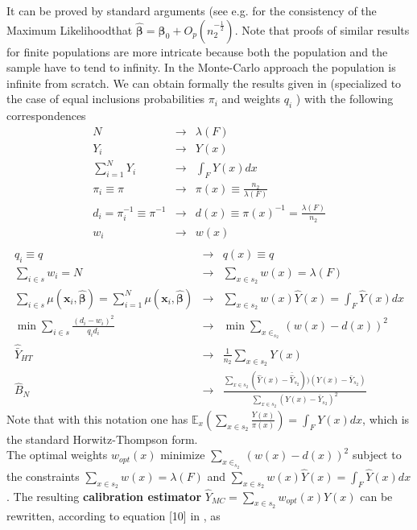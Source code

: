\documentclass[a4paper,12pt,leqno, titlepage]{article}
\newcommand{\EX}{\mathbb{E}}
\begin{document}
\begin{appendix}
{{{{  It can be proved by standard arguments (see e.g. \cite{cox} for the consistency of the Maximum Likelihoodthat $\hat{\pmb{\beta}}=\pmb{\beta}_0+O_p(n_2^{-\frac{1}{2}})$. Note that proofs of similar results for finite populations are more intricate because both the population and the sample have to tend to infinity. In the Monte-Carlo approach the population is infinite from scratch. We can obtain formally the results given in \cite{wusitter1} (specialized to the case of equal inclusions probabilities $\pi_i$ and weights $q_i$ ) with the following correspondences
  \begin{eqnarray*}
  N & \rightarrow & \lambda(F) \\
  Y_i &\rightarrow & Y(x) \\
  \sum_{i=1}^N Y_i &\rightarrow & \int_{F} Y(x)dx \\
  \pi_i \equiv \pi &\rightarrow & \pi(x)\equiv \frac{n_2}{\lambda(F)} \\
  d_i=\pi_i^{-1}\equiv \pi^{-1} &\rightarrow & d(x)\equiv \pi(x)^{-1}=\frac{\lambda(F)}{n_2} \\
  w_i &\rightarrow & w(x)             \\
  \end{eqnarray*}
  \begin{eqnarray*}
  q_i \equiv q &\rightarrow & q(x)\equiv q \\
  \sum_{i\in{s}}w_i=N &\rightarrow & \sum_{x\in{s_2}}w(x)=\lambda(F) \\
  \sum_{i\in{s}}\mu(\pmb{x}_i,\hat{\pmb{\beta}}) = \sum_{i=1}^N\mu(\pmb{x}_i,\hat{\pmb{\beta}})
  &\rightarrow &\sum_{x\in{s_2}}w(x)\hat{Y}(x) =  \int_F \hat{Y}(x)dx \\
  \min \sum_{i\in{s}}\frac{(d_i-w_i)^2}{q_i d_i} & \rightarrow & \min \sum_{x\in_{s_2}}(w(x)-d(x))^2\\
  \hat{\bar{Y}}_{HT} &\rightarrow & \frac{1}{n_2}\sum_{x\in{s_2}}Y(x) \\
  \hat{B}_N &\rightarrow & \frac{\sum_{x\in{s_2}}(\hat{Y}(x)-\bar{\hat{Y}}_{s_2}))(Y(x)-\bar{Y}_{s_2})}
  {\sum_{x\in{s_2}}(Y(x)-\bar{Y}_{s_2})^2}
  \end{eqnarray*}
  Note that with this notation one has $\EX_x(\sum_{x\in{s_2}}\frac{Y(x)}{\pi(x)})=\int_{F}Y(x)dx$, which is the standard Horwitz-Thompson form.\\
  The optimal weights $w_{opt}(x)$ minimize $\sum_{x\in_{s_2}}(w(x)-d(x))^2$ subject to the constraints
  $\sum_{x\in{s_2}}w(x)=\lambda(F) $ and $\sum_{x\in{s_2}}w(x)\hat{Y}(x)= \int_F \hat{Y}(x)dx$. The resulting \textbf{calibration estimator} $\hat{Y}_{MC}=\sum_{x\in{s_2}}w_{opt}(x)Y(x)$ can be rewritten, according to equation [10] in \cite{wusitter1}, as
}}}}
\end{appendix}
\end{document}
